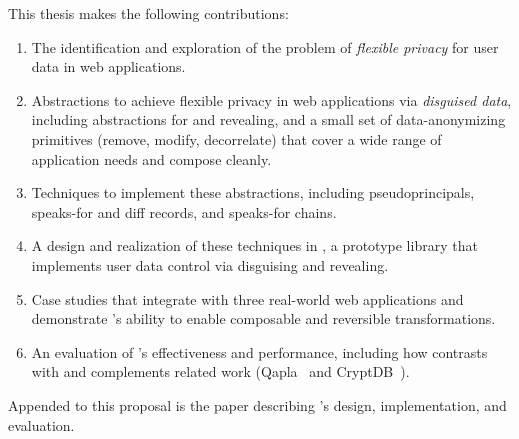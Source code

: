 \label{sec:intro:contrib}
%
This thesis makes the following contributions: 
\begin{enumerate}[nosep]
    \item The identification and exploration of the problem of \emph{flexible
        privacy} for user data in web applications.

    \item Abstractions to achieve flexible privacy in web applications via \emph{disguised data},
        including abstractions for \xxing and revealing, and a small set of
        data-anonymizing primitives (remove, modify, decorrelate) that cover a
        wide range of application needs and compose cleanly.

    \item Techniques to implement these abstractions, including
    pseudoprincipals, speaks-for and diff
    records, and speaks-for chains.

    \item A design and realization of these techniques in \sys, a prototype
        library that implements user data control via disguising and revealing.

    \item Case studies that integrate \sys with three real-world web
    applications and demonstrate \sys's ability to enable composable and
    reversible transformations.

    \item An evaluation of \sys's effectiveness and performance, including how
    \sys contrasts with and complements related work (Qapla~\cite{qapla} and
    CryptDB~\cite{cryptdb}).  
\end{enumerate}
%
Appended to this proposal is the \sys paper describing \sys's design, implementation, and evaluation.

\iffalse
\subsection{Limitations}
%
While disguised data can help developers to add more flexible user data
controls, the abstraction and its implementation in \sys have some limitations. 
%
First, disguised data is a concept scoped for single applications, and does not tackle the problem of data sharing between services.
%
%
Second, \sys assumes bug-free \xx specifications, and that applications use \sys
correctly.
%
Third, \sys does not aim to protect un\xxed data in the database against compromise;
combining \sys with an encrypted database can add this protection.
%
Finally, attacks to identify users from \sys's metadata (\eg the size of
stored \xxed data) or placeholder data left in the database (\eg embedded text)
are out of scope.
%
\fi

